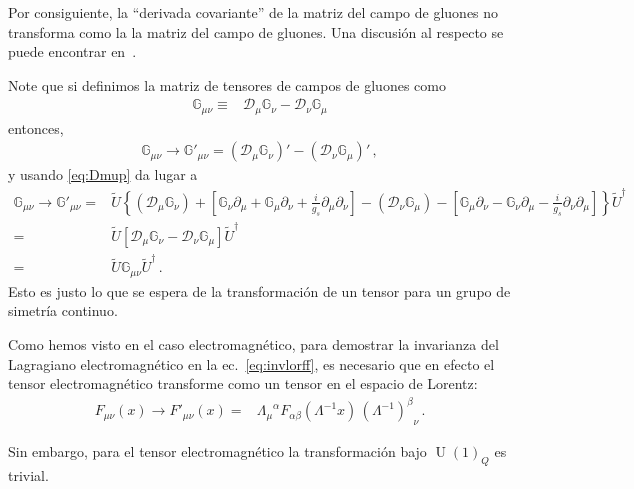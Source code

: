 Por consiguiente, la ``derivada covariante'' de la matriz del campo de gluones no transforma como la la matriz del campo de gluones. Una discusión al respecto se puede encontrar en~\cite{2015arXiv151203827R}.

\begin{frame}
Note que si definimos la matriz de tensores de campos de gluones como
\begin{align}
   \mathbb{G}_{\mu\nu}\equiv & \mathcal{D}_{\mu} \mathbb{G}_{\nu}-\mathcal{D}_{\nu} \mathbb{G}_{\mu} 
\end{align}
entonces,
\begin{align}
   \mathbb{G}_{\mu\nu}\to  \mathbb{G}'_{\mu\nu}=\left( \mathcal{D}_{\mu} \mathbb{G}_{\nu} \right)'-\left( \mathcal{D}_{\nu} \mathbb{G}_{\mu}  \right)'\,,
\end{align}
y usando \eqref{eq:Dmup} da lugar a
\begin{align}
\label{eq:ugum}
    \mathbb{G}_{\mu\nu}\to  \mathbb{G}'_{\mu\nu}=&  \widetilde{U} \left\{ \left( \mathcal{D}_{\mu}\mathbb{G}_\nu   \right)
    +  \left[ \mathbb{G}_{\nu} \partial_{\mu}+\mathbb{G}_{\mu}\partial_{\nu}+\frac{i}{g_s} \partial_{\mu}\partial_{\nu} \right]
  -   \left( \mathcal{D}_{\nu}\mathbb{G}_\mu   \right)
    - \left[ \mathbb{G}_{\mu} \partial_{\nu}-\mathbb{G}_{\nu}\partial_{\mu}-\frac{i}{g_s} \partial_{\nu}\partial_{\mu} \right]  \right\} \widetilde{U}^{\dagger} \nonumber\\
=&  \widetilde{U} \left[  \mathcal{D}_{\mu}\mathbb{G}_\nu 
    -   \mathcal{D}_{\nu}\mathbb{G}_\mu
  \right] \widetilde{U}^{\dagger} \nonumber\\
=& \widetilde{U} \mathbb{G}_{\mu\nu} \widetilde{U}^{\dagger}\,.
\end{align}
Esto es justo lo que se espera de la transformación de un tensor para un grupo de simetría continuo.
\end{frame}

Como hemos visto en el caso electromagnético, para demostrar la invarianza del Lagragiano electromagnético en la ec.~\eqref{eq:invlorff}, es necesario que en efecto el tensor electromagnético transforme como un tensor en el espacio de Lorentz:
\begin{align}
  F_{\mu\nu}(x) \to F'_{\mu\nu}(x)  =& { \Lambda_{\mu}}^{\alpha}F_{\alpha\beta}\left( \Lambda^{-1}x \right)\,
                   {\left( \Lambda^{-1} \right)^{\beta}}_{\nu} \,.
\end{align}


Sin embargo, para el tensor electromagnético la transformación bajo $\operatorname{U}(1)_Q$ es trivial.


